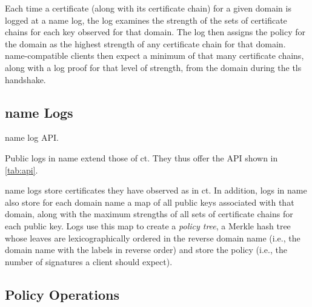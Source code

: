 Each time a certificate (along with its certificate chain) for a given domain is
logged at a \ac{name} log, the log examines the strength of the sets of
certificate chains for each key observed for that domain. The log then assigns
the policy for the domain as the highest strength of any certificate chain for
that domain. \ac{name}-compatible clients then expect a minimum of that many
certificate chains, along with a log proof for that level of strength, from the
domain during the \ac{tls} handshake.

\subsection{\ac{name} Logs}

\begin{table}[t]
  \centering
  \caption{\ac{name} log API. }
  
  \label{tab:api}
\end{table}

Public logs in \ac{name} extend those of \ac{ct}. They thus offer the API shown
in \autoref{tab:api}.

\ac{name} logs store certificates they have observed as in \ac{ct}. In addition,
logs in \ac{name} also store for each domain name a map of all public keys
associated with that domain, along with the maximum strengths of all sets of
certificate chains for each public key. Logs use this map to create a
\emph{policy tree}, a Merkle hash tree whose leaves are lexicographically
ordered in the reverse domain name (i.e., the domain name with the labels in
reverse order) and store the policy (i.e., the number of signatures a client
should expect).


\subsection{Policy Operations}

